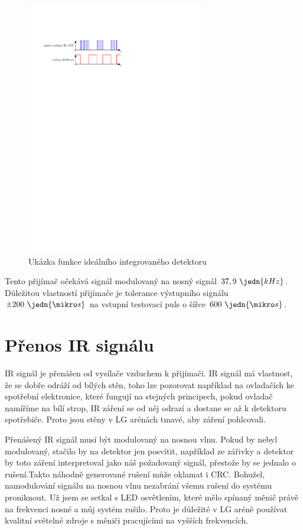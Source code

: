 \begin{figure}[H]
    \begin{center}
        \includegraphics[width=0.7\textwidth]{img/funkce-ir-detektoru}
    \end{center}
    \caption{Ukázka funkce ideálního integrovaného detektoru}
\end{figure}

Tento přijímač očekává signál modulovaný na nosný signál $37,9~\jedn{kHz}$. Důležitou vlastností přijímače je tolerance výstupního signálu $\pm 200~\jedn{\mikro s}$ na vstupní testovací puls o šířce $600~\jedn{\mikro s}$.

\section{Přenos IR signálu}
IR signál je přenášen od vysílače vzduchem k přijímači. IR signál má vlastnost, že se dobře odráží od bílých stěn, toho lze pozorovat například na ovladačích ke spotřební elektronice, které fungují na stejných principech, pokud ovladač namíříme na bílí strop, IR záření se od něj odrazí a dostane se až k detektoru spotřebiče. Proto jsou stěny v LG arénách tmavé, aby záření pohlcovali.

Přenášený IR signál musí být modulovaný na nosnou vlnu. Pokud by nebyl modulovaný, stačilo by na detektor jen posvítit, například ze zářivky a detektor by toto záření interpretoval jako náš požadovaný signál, přestože by se jednalo o rušení.Takto náhodně generované rušení může oklamat i CRC. Bohužel, namodulování signálu na nosnou vlnu nezabrání všemu rušení do systému proniknout. Už jsem se setkal s LED osvětlením, které mělo spínaný měnič právě na frekvenci nosné a můj systém rušilo. Proto je důležité v LG aréně používat kvalitní světelné zdroje s měniči pracujícími na vyšších frekvencích.

